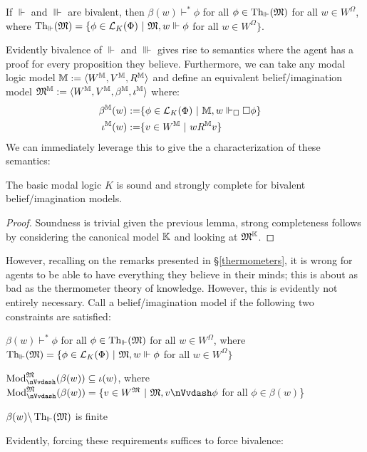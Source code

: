 \begin{corollary}
  If $\Vdash$ and $\Vvdash$ are bivalent, then $\beta (w) \vdash^{\ast} \phi$
  for all $\phi \in \tmop{Th}_{\Vdash} (\Omega)$ for all $w \in W^{\Omega}$,
  where $\tmop{Th}_{\Vdash} (\Omega) =\{\phi \in \mathcal{L}_K (\Phi)
  \  | \  \Omega, w \Vdash \phi$ for all $w \in W^{\Omega}
  \}$.
\end{corollary}

Evidently bivalence of $\Vdash$ and $\Vvdash$ gives rise to semantics where
the agent has a proof for every proposition they believe.   Furthermore, we
can take any modal logic model $\mathbbm{M} \assign \langle W^{\mathbbm{M}},
V^{\mathbbm{M}}, R^{\mathbbm{M}} \rangle$ and define an equivalent
belief/imagination model $\Omega^{\mathbbm{M}} \assign \langle
W^{\mathbbm{M}}, V^{\mathbbm{M}}, \beta^{\mathbbm{M}}, \iota^{\mathbbm{M}}
\rangle$ where:
\begin{eqnarray}
  \beta^{\mathbbm{M}} (w) \assign & \{\phi \in \mathcal{L}_K (\Phi) \ 
  | \  \mathbbm{M}, w \Vdash_{\Box} \Box \phi\} &  \nonumber\\
  \iota^{\mathbbm{M}} (w) \assign & \{v \in W^{\mathbbm{M}} \  |
  \  w R^{\mathbbm{M}} v\} &  \nonumber
\end{eqnarray}
We can immediately leverage this to give the a characterization of these
semantics:

\begin{proposition}
  The basic modal logic $K$ is sound and strongly complete for bivalent
  belief/imagination models.
\end{proposition}

\begin{proof}
  Soundness is trivial given the previous lemma, strong completeness follows
  by considering the canonical model $\mathbbm{K}$ and looking at
  $\Omega^{\mathbbm{K}}$. 
\end{proof}

However, recalling on the remarks presented in \S\ref{thermometers},
it is wrong for agents to be able to have everything they believe in 
their minds; this is about as bad as the thermometer theory of knowledge.   
However, this is evidently not entirely necessary. 
Call a belief/imagination model
 if the following two constraints are satisfied:
\begin{itemizedot}
  \item $\beta (w) \vdash^{\ast} \phi$ for all $\phi \in \tmop{Th}_{\Vdash}
  (\Omega)$ for all $w \in W^{\Omega}$, where $\tmop{Th}_{\Vdash} (\Omega)
  =\{\phi \in \mathcal{L}_K (\Phi) \  | \  \Omega, w \Vdash
  \phi$ for all $w \in W^{\Omega} \}$
  
  \item $\tmop{Mod}^{\Omega}_{{\nVvdash}} (\beta (w)) \subseteq \iota (w)$,
  where $\tmop{Mod}^{\Omega}_{{\nVvdash}} (\beta (w)) =\{v \in W^{\Omega}
  \  | \  \Omega, v {\nVvdash} \phi$ for all $\phi \in
  \beta (w)$\}
  
  \item $\beta (w) \backslash \tmop{Th}_{\Vdash} (\Omega)$ is finite
\end{itemizedot}
Evidently, forcing these requirements suffices to force bivalence:

